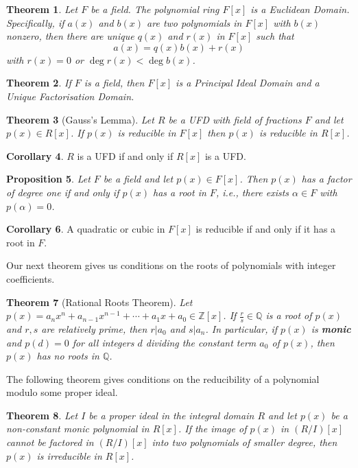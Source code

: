 \documentclass[10pt, oneside, reqno]{amsart}
\theoremstyle{plain}%
\newtheorem{thm}{Theorem}[section]
\newtheorem{prop}[thm]{Proposition}
\theoremstyle{definition}
\newtheorem{cor}[thm]{Corollary}
\theoremstyle{remark}
\newcommand{\al}{\alpha}
\newcommand{\Q}{\mathbb{Q}}
\newcommand{\Z}{\mathbb{Z}}
\begin{document}
\begin{thm}
    Let $F$ be a field.  The polynomial ring $F[x]$ is a Euclidean Domain.  Specifically, if $a(x)$ and $b(x)$  are two polynomials in $F[x]$ with $b(x)$ nonzero, then there are unique $q(x)$ and $r(x)$ in $F[x]$ such that \[
        a(x) = q(x) b(x) + r(x)
    \] with $r(x) = 0$ or $\deg r(x) < \deg b(x)$.
\end{thm}

\begin{thm}
    If $F$ is a field, then $F[x]$ is a Principal Ideal Domain and a Unique Factorisation Domain.
\end{thm}

\begin{thm}[Gauss's Lemma]
    Let $R$ be a UFD with field of fractions $F$ and let $p(x) \in R[x]$.  If $p(x)$ is reducible in $F[x]$ then $p(x)$ is reducible in $R[x]$.
\end{thm}

\begin{cor}
    $R$ is a UFD if and only if $R[x]$ is a UFD.
\end{cor}


\begin{prop}
    Let $F$ be a field and let $p(x) \in F[x]$.  Then $p(x)$ has a factor of degree one if and only if $p(x)$ has a root in $F$, i.e., there exists $\al \in F$ with $p(\al) = 0$.
\end{prop}

\begin{cor}
    A quadratic or cubic in $F[x]$ is reducible if and only if it has a root in $F$.
\end{cor}

Our next theorem gives us conditions on the roots of polynomials with integer coefficients.

\begin{thm}[Rational Roots Theorem]
    Let $p(x) = a_n x^n + a_{n-1} x^{n-1} + \cdots + a_1 x + a_0 \in \Z[x]$.  If $\frac{r}{s} \in \Q$ is a root of $p(x)$ and $r,s$ are relatively prime, then $r | a_0$ and $s | a_n$.  In particular, if $p(x)$ is \textbf{monic} and $p(d) = 0$ for all integers $d$ dividing the constant term $a_0$ of $p(x)$, then $p(x)$ has no roots in $\Q$.
\end{thm}

The following theorem gives conditions on the reducibility of a polynomial modulo some proper ideal.

\begin{thm}
    Let $I$ be a proper ideal in the integral domain $R$ and let $p(x)$ be a non-constant monic polynomial in $R[x]$.  If the image of $p(x)$ in $(R/I)[x]$ cannot be factored in $(R/I)[x]$ into two polynomials of smaller degree, then $p(x)$ is irreducible in $R[x]$.
\end{thm}
\end{document}
